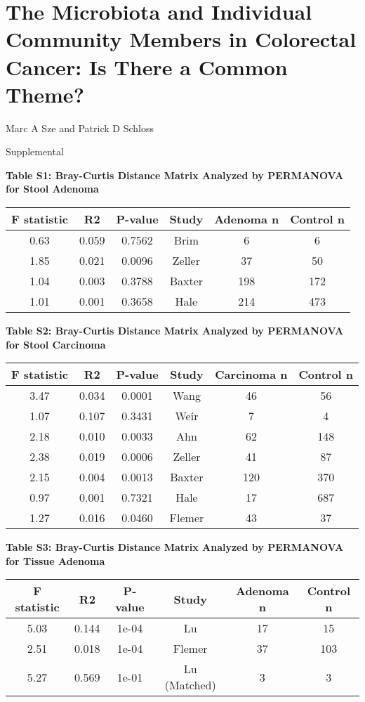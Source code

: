 \documentclass[12pt,]{article}
\title{}
\author{}
\date{}
\begin{document}
\section{The Microbiota and Individual Community Members in Colorectal
Cancer: Is There a Common
Theme?}\label{the-microbiota-and-individual-community-members-in-colorectal-cancer-is-there-a-common-theme}

\vspace{10mm}

\begin{center}
Marc A Sze and Patrick D Schloss

\vspace{10mm}

Supplemental
\end{center}

\newpage

\textbf{Table S1: Bray-Curtis Distance Matrix Analyzed by PERMANOVA for
Stool Adenoma}

\begin{longtable}[]{@{}cccccc@{}}
\toprule
F statistic & R2 & P-value & Study & Adenoma n & Control
n\tabularnewline
\midrule
\endhead
0.63 & 0.059 & 0.7562 & Brim & 6 & 6\tabularnewline
1.85 & 0.021 & 0.0096 & Zeller & 37 & 50\tabularnewline
1.04 & 0.003 & 0.3788 & Baxter & 198 & 172\tabularnewline
1.01 & 0.001 & 0.3658 & Hale & 214 & 473\tabularnewline
\bottomrule
\end{longtable}

\newpage

\textbf{Table S2: Bray-Curtis Distance Matrix Analyzed by PERMANOVA for
Stool Carcinoma}

\begin{longtable}[]{@{}cccccc@{}}
\toprule
F statistic & R2 & P-value & Study & Carcinoma n & Control
n\tabularnewline
\midrule
\endhead
3.47 & 0.034 & 0.0001 & Wang & 46 & 56\tabularnewline
1.07 & 0.107 & 0.3431 & Weir & 7 & 4\tabularnewline
2.18 & 0.010 & 0.0033 & Ahn & 62 & 148\tabularnewline
2.38 & 0.019 & 0.0006 & Zeller & 41 & 87\tabularnewline
2.15 & 0.004 & 0.0013 & Baxter & 120 & 370\tabularnewline
0.97 & 0.001 & 0.7321 & Hale & 17 & 687\tabularnewline
1.27 & 0.016 & 0.0460 & Flemer & 43 & 37\tabularnewline
\bottomrule
\end{longtable}

\newpage

\textbf{Table S3: Bray-Curtis Distance Matrix Analyzed by PERMANOVA for
Tissue Adenoma}

\begin{longtable}[]{@{}cccccc@{}}
\toprule
F statistic & R2 & P-value & Study & Adenoma n & Control
n\tabularnewline
\midrule
\endhead
5.03 & 0.144 & 1e-04 & Lu & 17 & 15\tabularnewline
2.51 & 0.018 & 1e-04 & Flemer & 37 & 103\tabularnewline
5.27 & 0.569 & 1e-01 & Lu (Matched) & 3 & 3\tabularnewline
\bottomrule
\end{longtable}
\end{document}
